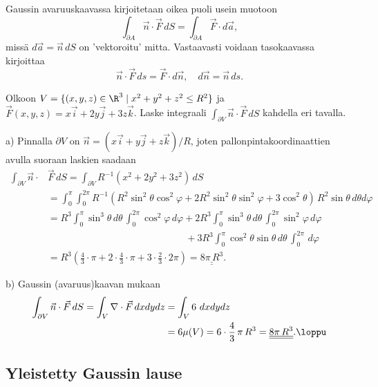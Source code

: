 Gaussin avaruuskaavassa kirjoitetaan oikea puoli usein muotoon
\[
\int_{\partial A} \vec n\cdot\vec F\,dS = \int_{\partial A} \vec F \cdot d\vec a,
\]
missä $d\vec a=\vec n\,dS$ on 'vektoroitu' mitta. Vastaavasti voidaan tasokaavassa kirjoittaa
\[
\vec n\cdot\vec F\,ds=\vec F\cdot d\vec n,\quad d\vec n=\vec n\,ds.
\]
\begin{Exa} Olkoon $V = \{(x,y,z) \in \R^3 \mid x^2+y^2+z^2 \le R^2\}$ ja 
$\vec F(x,y,z) = x\vec i + 2y\vec j + 3z\vec k$. Laske integraali 
$\int_{\partial V} \vec n\cdot\vec F\,dS$ kahdella eri tavalla.
\end{Exa}
\ratk a) Pinnalla $\partial V$ on $\vec n = (x\vec i + y\vec j + z\vec k)/R$, joten
pallonpintakoordinaattien avulla suoraan laskien saadaan
\begin{align*}
\int_{\partial V} 
\vec n\cdot &\vec F\,dS = \int_{\partial V} R^{-1}(x^2+2y^2+3z^2)\,dS \\
            &= \int_0^\pi\int_0^{2\pi} R^{-1}
               (R^2\sin^2\theta\cos^2\varphi+2R^2\sin^2\theta\sin^2\varphi
                                            +3\cos^2\theta)\,R^2\sin\theta\,d\theta d\varphi \\
            &=   R^3\int_0^\pi \sin^3\theta\,d\theta\,\int_0^{2\pi}\cos^2\varphi\,d\varphi
               +2R^3\int_0^\pi \sin^3\theta\,d\theta\,\int_0^{2\pi}\sin^2\varphi\,d\varphi \\
            &\phantom{=\ R^3\int_0^\pi 
                            \sin^2\theta\,d\theta\,\int_0^{2\pi}\cos^2\varphi\,d\varphi}
               +3R^3\int_0^\pi \cos^2\theta\sin\theta\,d\theta\,\int_0^{2\pi}\,d\varphi \\
            &= R^3\left(\frac{4}{3}\cdot\pi + 2\cdot\frac{4}{3}\cdot\pi 
                                            + 3\cdot\frac{2}{3}\cdot 2\pi\right)
             = \underline{\underline{8\pi\,R^3}}.
\end{align*}

b) Gaussin (avaruus)kaavan mukaan
\begin{align*}
\int_{\partial V} \vec n\cdot\vec F\,dS = \int_V \nabla\cdot\vec F\,dxdydz 
                                       &= \int_V 6\ dxdydz \\ 
                                       &= 6\mu(V) = 6\cdot\frac{4}{3}\,\pi\,R^3 
                                        = \underline{\underline{8\pi\,R^3}}. \loppu
\end{align*}

\subsection{Yleistetty Gaussin lause}

